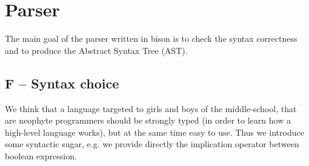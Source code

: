 \section{Parser}
\label{sec:parser}
The main goal of the parser written in bison is to check the
syntax correctness and to produce the Abstract Syntax Tree (AST). 

\subsection{F -- Syntax choice}
We think that a language targeted to girls and boys of the middle-school,
that are neophyte programmers should be strongly typed (in order to 
learn how a high-level language works), but at the same
time easy to use. Thus we introduce some syntactic sugar, e.g. we 
provide directly the implication operator between boolean expression.



